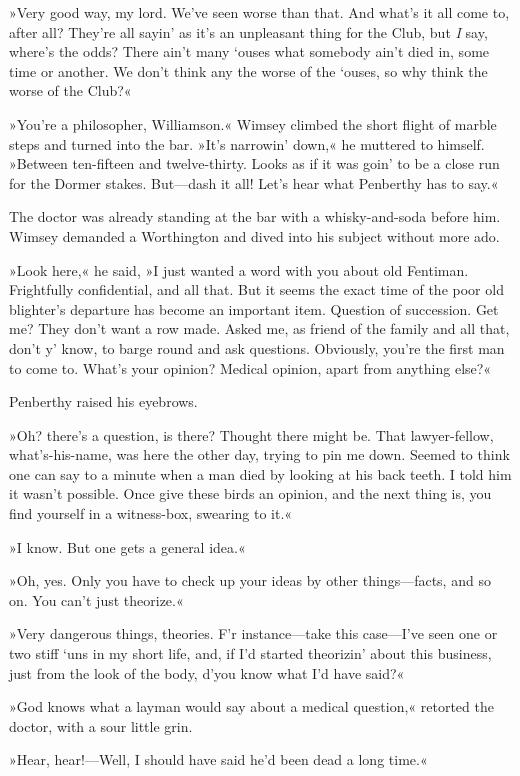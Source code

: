 »Very good way, my lord. We've seen worse than that. And what's it all come to, after all? They're all sayin' as it's an unpleasant thing for the Club, but \textit{I} say, where's the odds? There ain't many `ouses what somebody ain't died in, some time or another. We don't think any the worse of the `ouses, so why think the worse of the Club?«

»You're a philosopher, Williamson.« Wimsey climbed the short flight of marble steps and turned into the bar. »It's narrowin' down,« he muttered to himself. »Between ten-fifteen and twelve-thirty. Looks as if it was goin' to be a close run for the Dormer stakes. But—dash it all! Let's hear what Penberthy has to say.«

The doctor was already standing at the bar with a whisky-and-soda before him. Wimsey demanded a Worthington and dived into his subject without more ado.

»Look here,« he said, »I just wanted a word with you about old Fentiman. Frightfully confidential, and all that. But it seems the exact time of the poor old blighter's departure has become an important item. Question of succession. Get me? They don't want a row made. Asked me, as friend of the family and all that, don't y' know, to barge round and ask questions. Obviously, you're the first man to come to. What's your opinion? Medical opinion, apart from anything else?«

Penberthy raised his eyebrows.

»Oh? there's a question, is there? Thought there might be. That lawyer-fellow, what's-his-name, was here the other day, trying to pin me down. Seemed to think one can say to a minute when a man died by looking at his back teeth. I told him it wasn't possible. Once give these birds an opinion, and the next thing is, you find yourself in a witness-box, swearing to it.«

»I know. But one gets a general idea.«

»Oh, yes. Only you have to check up your ideas by other things—facts, and so on. You can't just theorize.«

»Very dangerous things, theories. F'r instance—take this case—I've seen one or two stiff `uns in my short life, and, if I'd started theorizin' about this business, just from the look of the body, d'you know what I'd have said?«

»God knows what a layman would say about a medical question,« retorted the doctor, with a sour little grin.

»Hear, hear!—Well, I should have said he'd been dead a long time.«

